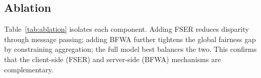 \documentclass[pdflatex,sn-mathphys-num]{sn-jnl}
\theoremstyle{thmstyleone}%
\theoremstyle{thmstyletwo}%
\theoremstyle{thmstylethree}%
\begin{document}
\begin{table}[t]\centering\small
\caption{Demographic Parity Difference (DPD, lower is fairer).}
\label{tab:main-dpd}

\end{table}

\begin{table}[t]\centering\small
\caption{Equal Opportunity Difference (EOD, lower is fairer).}
\label{tab:main-eod}

\end{table}

\subsection{Ablation}
\label{sec:exp-ablation}
Table~\ref{tab:ablation} isolates each component. Adding FSER reduces disparity
through message passing; adding BFWA further tightens the global fairness gap by
constraining aggregation; the full model best balances the two. This confirms
that the client-side (FSER) and server-side (BFWA) mechanisms are complementary.

\begin{table}[t]\centering\small
\caption{Ablation of TrustFedGNN components (no DP). AUC / DPD per dataset.}
\label{tab:ablation}

\end{table}
\end{document}
